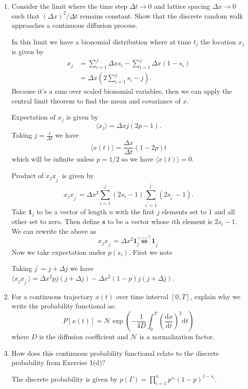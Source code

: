 \documentclass{article}
\newenvironment{answer}
    {\begin{mdframed}[linewidth=0.5pt,backgroundcolor=gray!5]
    \vspace{0.5em}}
    {\vspace{0.5em}\end{mdframed}}
\begin{document}
\begin{enumerate}
    \item[(a)] Consider the limit where the time step $\Delta t \to 0$ and lattice spacing $\Delta x \to 0$ such that $(\Delta x)^2/\Delta t$ remains constant. Show that the discrete random walk approaches a continuous diffusion process.
    \begin{answer}
        In this limit we have a bionomial distribution where at time $t_j$ the location $x_j$ is given by
        \begin{eqnarray}
        x_j & = \sum_{i=1}^j \Delta x s_i - \sum_{i=1}^j \Delta x (1-s_i) \nonumber \\
        & = \Delta x\left(2 \sum_{i=1}^j s_i - j\right).
        \end{eqnarray}
        Because it's a sum over scaled bionomial variables, then we can apply the central limit theorem to find the mean and covariance of $x$.
        
        Expectation of $x_j$ is given by 
        $$
        \langle x_j\rangle = \Delta x j (2 p - 1).
        $$ 
        Taking $j=\frac{t}{\Delta t}$ we have 
        $$
        \langle x(t)\rangle = \frac{\Delta x}{\Delta t}(1- 2p)t
        $$ 
        which will be infinite unless $p=1/2$ so we have $\langle x(t)\rangle = 0$.
        
        Product of $x_j x_{j^\prime}$ is given by 
        $$
        x_j x_{j^\prime} = \Delta x^2 \sum_{i=1}^j (2 s_i -1)\sum_{{i^\prime}=1}^{j^\prime} (2s_{i^\prime} -1).
        $$
        Take $\mathbf{1}_j$ to be a vector of length $n$ with the first $j$ elements set to 1 and all other set to zero. Then define $\hat{\mathbf{s}}$ to be a vector whose $i$th element is $2s_i -1$. We can rewrite the above as
        $$
        x_j x_{j^\prime} = \Delta x^2 \mathbf{1}_j ^\top \hat{\mathbf{s}}\hat{\mathbf{s}}^\top \mathbf{1}_{j^\prime}
        $$
        Now we take expectation under $p(s_i)$. First we note 


         Taking $j^\prime = j+\Delta j$ we have $\langle x_j x_{j^\prime}\rangle = \Delta x^2 p j (j+\Delta j) - \Delta x^2 (1-p) j (j+\Delta j)$.
    \end{answer}
    \item[(b)] For a continuous trajectory $x(t)$ over time interval $[0,T]$, explain why we write the probability functional as:
    \[ 
    P[x(t)] = \mathcal{N} \exp\left(-\frac{1}{4D}\int_0^T \left(\frac{\text{d}x}{\text{d}t}\right)^2 \text{d}t\right) 
    \]
    where $D$ is the diffusion coefficient and $\mathcal{N}$ is a normalization factor.
    \begin{answer}
    \end{answer}
    \item[(c)] How does this continuous probability functional relate to the discrete probability from Exercise 1(d)?
    \begin{answer}
        The discrete probability is given by $p(\Gamma) = \prod_{i=1}^n p^{s_i}(1-p)^{1-s_i}$.
    \end{answer}
\end{enumerate}
\end{document}
